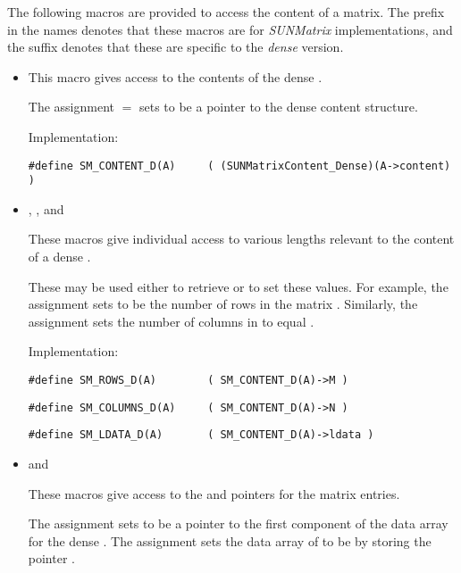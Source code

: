 \noindent The following macros are provided to access the
content of a {\sunmatdense} matrix. The prefix  in the names
denotes that these macros are for \emph{SUNMatrix} implementations,
and the suffix  denotes that these are specific to
the \emph{dense} version.
\begin{itemize}

\item {}
    
  This macro gives access to the contents of the
  dense .
  
  The assignment  $=$  sets
   to be a pointer to the dense  content  
  structure.                                             
                                                            
  Implementation: 
  
  \verb|#define SM_CONTENT_D(A)     ( (SUNMatrixContent_Dense)(A->content) )|
  
\item {}, , and 

  These macros give individual access to various lengths relevant to the
  content of a dense .                        
                                                               
  These may be used either to retrieve or to set these values.  For
  example, the assignment  sets  to be
  the number of rows in the matrix .  Similarly, the
  assignment  sets the number of
  columns in  to equal .
  
  Implementation: 

  \verb|#define SM_ROWS_D(A)        ( SM_CONTENT_D(A)->M )|

  \verb|#define SM_COLUMNS_D(A)     ( SM_CONTENT_D(A)->N )|

  \verb|#define SM_LDATA_D(A)       ( SM_CONTENT_D(A)->ldata )|

\item {} and 
                                                            
  These macros give access to the  and  pointers for
  the matrix entries.

  The assignment  sets  to be     
  a pointer to the first component of the data array for the dense
   .  The assignment 
  sets the data array of  to be  by storing the
  pointer .
  

\end{itemize}
